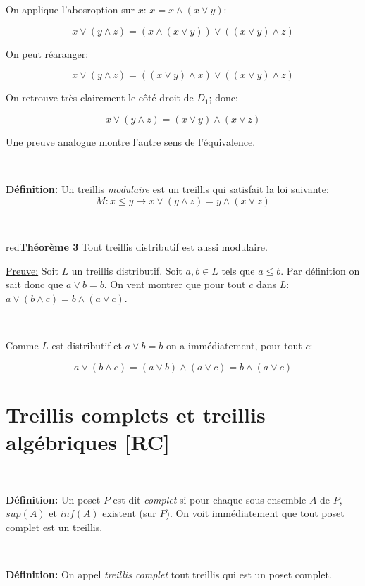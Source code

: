 \documentclass[a4paper, 11pt]{article}
\begin{document}
On applique l'abosroption sur $x$: $x = x \land (x \lor y)$:


$$ x \lor (y \land z) = (x \land (x \lor y)) \lor ((x \lor y) \land z)$$

On peut réaranger:


$$ x \lor (y \land z) = ((x \lor y) \land x) \lor ((x \lor y) \land z)$$

On retrouve très clairement le côté droit de $D_1$; donc:

$$x \lor (y \land z) = (x \lor y) \land (x \lor z)$$

Une preuve analogue montre l'autre sens de l'équivalence.

\

\begin{tcolorbox} 
	\textbf{Définition:} Un treillis \textit{modulaire} est un treillis qui satisfait la loi suivante:
	$$M: x \leq y \rightarrow x \lor (y \land z) = y \land (x \lor z)$$
\end{tcolorbox}

\

\begin{mybox}{red}{\textbf{Théorème 3}}
	Tout treillis distributif est aussi modulaire.
\end{mybox}

\noindent
\underline{Preuve:} Soit $L$ un treillis distributif. Soit $a,b \in L$ tels que $a \leq b$. Par définition on sait donc que $a \lor b = b$. On vent montrer que pour tout $c$ dans $L$: $a \lor (b \land c) = b \land (a \lor c)$.

\

Comme $L$ est distributif et $a \lor b = b$ on a immédiatement, pour tout $c$:

$$a \lor (b \land c) = (a \lor b) \land (a \lor c) = b \land (a \lor c)$$

\section{Treillis complets et treillis algébriques [RC]}

\

\begin{tcolorbox} 
	\textbf{Définition:} Un poset $P$ est dit \textit{complet} si pour chaque sous-ensemble $A$ de $P$, $sup(A)$ et $inf(A)$ existent (sur $P$). On voit immédiatement que tout poset complet est un treillis. 
\end{tcolorbox}

\

\begin{tcolorbox} 
	\textbf{Définition:} On appel \textit{treillis complet} tout treillis qui est un poset complet. 
\end{tcolorbox}
\end{document}

